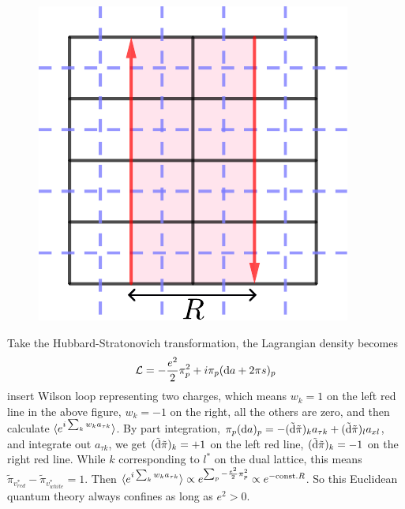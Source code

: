 \documentclass[a4paper,11pt]{article}
\begin{document}
\begin{figure}
    \centering
    \includegraphics[width = 0.8\linewidth]{Two_elections.pdf}
    \label{two_elections}
\end{figure}
Take the Hubbard-Stratonovich transformation, the Lagrangian density becomes
\begin{equation}
    \mathcal{L} = -\frac{e^2}{2} \pi_p^2 + i\pi_p ({\rm d}a + 2\pi s)_p
\end{equation}
insert Wilson loop representing two charges, which means $w_k = 1$ on the left red line in the above figure, $w_k = -1$ on the right, all the others are zero, and then calculate $\braket{e^{i\sum_k w_k a_{\tau k}}}$. 
By part integration, $\pi _p ({\rm d}a)_p = -(\tilde{\rm d}\tilde{\pi})_{k} a_{\tau k} + (\tilde{\rm d}\tilde{\pi})_{l} a_{x l}$, and integrate out $a_{\tau k}$, we get $(\tilde{\rm d}\tilde{\pi})_{k} = +1$ on the left red line, $(\tilde{\rm d}\tilde{\pi})_{k} = -1$ on the right red line. 
While $k$ corresponding to $l^*$ on the dual lattice, this means $\tilde{\pi} _ {v^*_{red}} - \tilde{\pi}_{v^*_{white}} = 1$. 
Then $\braket{e^{i\sum_k w_k a_{\tau k}}} \propto e^{\sum_p -\frac{e^2}{2} \pi_p^2} \propto e^{-{\rm const.}R}$. So this Euclidean quantum theory always confines as long as $e^2 >0$.
\end{document}
